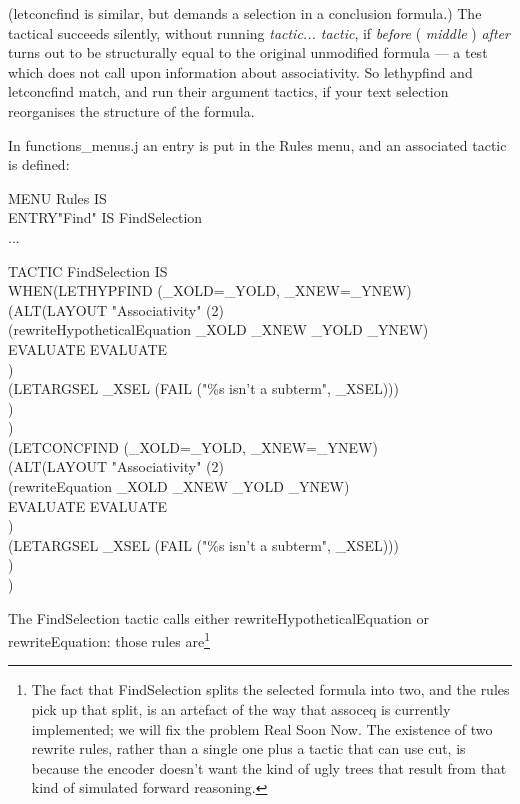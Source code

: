 (letconcfind is similar, but demands a selection in a conclusion formula.) The tactical succeeds silently, without running \textit{tactic... tactic}, if \textit{before} ( \textit{middle} ) \textit{after} turns out to be structurally equal to the original unmodified formula --- a test which does not call upon information about associativity. So lethypfind and letconcfind match, and run their argument tactics, if your text selection reorganises the structure of the formula.


In functions\_menus.j an entry is put in the Rules menu, and an associated tactic is defined:

MENU Rules IS\\
\tab ENTRY\tab "Find" \tab IS FindSelection\\
\tab ...

TACTIC FindSelection IS\\
\tab WHEN\tab (LETHYPFIND (\_XOLD=\_YOLD, \_XNEW=\_YNEW)\\
\tab \tab \tab (ALT\tab (LAYOUT "Associativity" (2)\\
\tab \tab \tab \tab \tab (rewriteHypotheticalEquation \_XOLD \_XNEW \_YOLD \_YNEW) \\
\tab \tab \tab \tab \tab EVALUATE EVALUATE\\
\tab \tab \tab \tab )\\
\tab \tab \tab \tab (LETARGSEL \_XSEL (FAIL ("\%s isn't a subterm", \_XSEL)))\\
\tab \tab \tab )\\
\tab \tab )\\
\tab \tab (LETCONCFIND (\_XOLD=\_YOLD, \_XNEW=\_YNEW)\\
\tab \tab \tab (ALT\tab (LAYOUT "Associativity" (2)\\
\tab \tab \tab \tab \tab (rewriteEquation \_XOLD \_XNEW \_YOLD \_YNEW) \\
\tab \tab \tab \tab \tab EVALUATE EVALUATE\\
\tab \tab \tab \tab )\\
\tab \tab \tab \tab (LETARGSEL \_XSEL (FAIL ("\%s isn't a subterm", \_XSEL)))\\
\tab \tab \tab )\\
\tab \tab )


The FindSelection tactic calls either rewriteHypotheticalEquation or rewriteEquation: those rules are\footnote{The fact that FindSelection splits the selected formula into two, and the rules pick up that split, is an artefact of the way that assoceq is currently implemented; we will fix the problem Real Soon Now. The existence of two rewrite rules, rather than a single one plus a tactic that can use cut, is because the encoder doesn't want the kind of ugly trees that result from that kind of simulated forward reasoning.}

